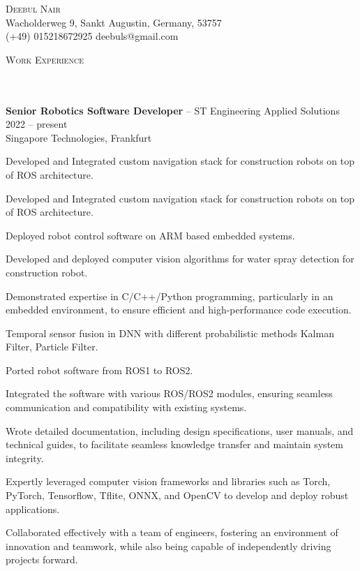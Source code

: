\documentclass{article}
\newcommand{\contact}[3]{
\vspace*{5pt}
\begin{center}
{\Huge \scshape {#1}}\\
\vspace{3pt}
#2 
\vspace{2pt}
#3
\end{center}
\vspace*{-8pt}
}
\newcommand{\header}[1]{{
\hspace*{-15pt}\vspace*{6pt} \textsc{#1}} \vspace*{-6pt} 
\lineunder
}
\newcommand{\lineunder}{
\vspace*{-8pt} \\ \hspace*{-18pt} 
\hrulefill \\
}
\newcommand{\content}{
\vspace*{2pt}%
}
\newcommand{\employer}[4]{{
\vspace*{2pt}%
\textbf{#1} #2 \hfill #3\\ #4 \vspace*{2pt}}
}
\renewcommand{\labelitemi}{
	\raisebox{0.3ex}{\tiny\textbullet}
}
\renewcommand{\labelitemii}{
	\raisebox{0.3ex}{\tiny\textbullet}
}
\newenvironment{bullet-list-minor}{
\begin{list}{\labelitemii}{\setlength\leftmargin{15pt} 
\topsep 0pt \itemsep -2pt}}{\vspace*{4pt}\end{list}
}
\begin{document}
\small
\smallskip
\vspace*{-44pt}

\contact{Deebul Nair}
{Wacholderweg 9, Sankt Augustin, Germany, 53757\\}
{(+49) 015218672925 \labelitemi deebuls@gmail.com}
\vspace{15pt}

\vspace*{4pt}%


\vspace*{4pt}%
\header{Work Experience}
    \employer{Senior Robotics Software Developer}{-- ST Engineering Applied Solutions }{2022 -- present}
    {Singapore Technologies, Frankfurt}
	\begin{bullet-list-minor}
	\item Developed and Integrated custom navigation stack for construction robots on top of ROS architecture.
	\item Developed and Integrated custom navigation stack for construction robots on top of ROS architecture.
	\item  Deployed robot control software on ARM based embedded systems.
        \item  Developed and deployed computer vision algorithms for water spray detection for construction robot. 
        \item  Demonstrated expertise in C/C++/Python programming, particularly in an embedded environment, to ensure efficient and high-performance code execution.
        \item  Temporal sensor fusion in DNN with different probabilistic methods Kalman Filter, Particle Filter. 
        \item  Ported robot software from ROS1 to ROS2.
        \item  Integrated the software with various ROS/ROS2 modules, ensuring seamless communication and compatibility with existing systems.
        \item  Wrote detailed documentation, including design specifications, user manuals, and technical guides, to facilitate seamless knowledge transfer and maintain system integrity.
        \item  Expertly leveraged computer vision frameworks and libraries such as Torch, PyTorch, Tensorflow, Tflite, ONNX, and OpenCV to develop and deploy robust applications.
        \item  Collaborated effectively with a team of engineers, fostering an environment of innovation and teamwork, while also being capable of independently driving projects forward.
        \end{bullet-list-minor}
\end{document}
